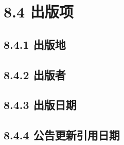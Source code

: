 \documentclass{article}
\begin{document}
\section*{8.4 出版项}
\begin{refsection}
\nocite{egbookpuba--}
\nocite{egbookpubb--}
\end{refsection}

\subsection*{8.4.1 出版地}
\begin{refsection}
\nocite{egbookpubaddressa--}
\nocite{egbookpubaddressb--}
\nocite{egbookpubaddressc--}
\nocite{egbookpubaddressd--}
\nocite{egbookpubaddresse--}
\nocite{egbookpubaddressf--}
\nocite{egbookpubaddressg--}
\end{refsection}


\subsection*{8.4.2 出版者}
\begin{refsection}
\nocite{egbookpubpublishera--}
\nocite{egbookpubpublisherb--}
\nocite{egbookpubpublisherc--}
\nocite{egbookpubpublisherd--}
\nocite{egbookpubpublishere--}
\nocite{egbookpubpublisherf--}
\end{refsection}

\subsection*{8.4.3 出版日期}
\begin{refsection}
\nocite{egbookpubdatea--}
\nocite{egbookpubdateb--}
\nocite{egbookpubdatec--}
\nocite{egbookpubdated--}
\nocite{egbookpubdatee--}
\nocite{egbookpubdatef--}
\end{refsection}

\subsection*{8.4.4 公告更新引用日期}
\begin{refsection}
\nocite{egbookpubdateg--}
\end{refsection}
\end{document}
